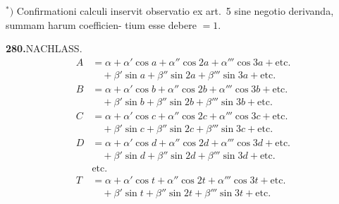 \documentclass[12pt,a4paper]{article}
\begin{document}
\smallskip\noindent
$^*)$ Confirmationi calculi inservit observatio ex art.\ 5 sine negotio derivanda, summam harum coefficien-
tium esse debere $=1$.

\newpage
\noindent\textbf{280.}\quad NACHLASS.
\begin{align*}
A &= \alpha + \alpha'\cos a + \alpha''\cos 2a + \alpha'''\cos 3a + \text{etc.}\\
  &\quad + \beta'\sin a + \beta''\sin 2a + \beta'''\sin 3a + \text{etc.}\\[2pt]
B &= \alpha + \alpha'\cos b + \alpha''\cos 2b + \alpha'''\cos 3b + \text{etc.}\\
  &\quad + \beta'\sin b + \beta''\sin 2b + \beta'''\sin 3b + \text{etc.}\\[2pt]
C &= \alpha + \alpha'\cos c + \alpha''\cos 2c + \alpha'''\cos 3c + \text{etc.}\\
  &\quad + \beta'\sin c + \beta''\sin 2c + \beta'''\sin 3c + \text{etc.}\\[2pt]
D &= \alpha + \alpha'\cos d + \alpha''\cos 2d + \alpha'''\cos 3d + \text{etc.}\\
  &\quad + \beta'\sin d + \beta''\sin 2d + \beta'''\sin 3d + \text{etc.}\\
  &\text{etc.}\\[2pt]
T &= \alpha + \alpha'\cos t + \alpha''\cos 2t + \alpha'''\cos 3t + \text{etc.}\\
  &\quad + \beta'\sin t + \beta''\sin 2t + \beta'''\sin 3t + \text{etc.}
\end{align*}
\end{document}
